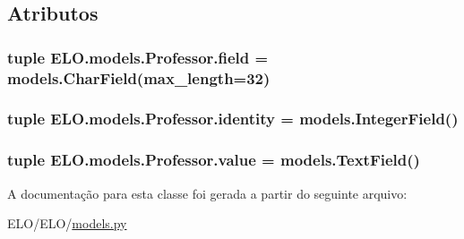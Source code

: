 \subsection{Atributos}
\hypertarget{classELO_1_1models_1_1Professor_aaf0638dbb44d27f5acadeed376afafa1}{
\subsubsection[{field}]{\setlength{\rightskip}{0pt plus 5cm}tuple E\-L\-O.\-models.\-Professor.\-field = models.\-Char\-Field(max\-\_\-length=32)\hspace{0.3cm}{\ttfamily [static]}}}\label{classELO_1_1models_1_1Professor_aaf0638dbb44d27f5acadeed376afafa1}
\hypertarget{classELO_1_1models_1_1Professor_a314012619a14c0319c86ba52b6beeb2f}{
\subsubsection[{identity}]{\setlength{\rightskip}{0pt plus 5cm}tuple E\-L\-O.\-models.\-Professor.\-identity = models.\-Integer\-Field()\hspace{0.3cm}{\ttfamily [static]}}}\label{classELO_1_1models_1_1Professor_a314012619a14c0319c86ba52b6beeb2f}
\hypertarget{classELO_1_1models_1_1Professor_abfa283169333876d02cf63886ca872e6}{
\subsubsection[{value}]{\setlength{\rightskip}{0pt plus 5cm}tuple E\-L\-O.\-models.\-Professor.\-value = models.\-Text\-Field()\hspace{0.3cm}{\ttfamily [static]}}}\label{classELO_1_1models_1_1Professor_abfa283169333876d02cf63886ca872e6}


A documentação para esta classe foi gerada a partir do seguinte arquivo\-:\begin{DoxyCompactItemize}
\item 
E\-L\-O/\-E\-L\-O/\hyperlink{ELO_2models_8py}{models.\-py}\end{DoxyCompactItemize}

